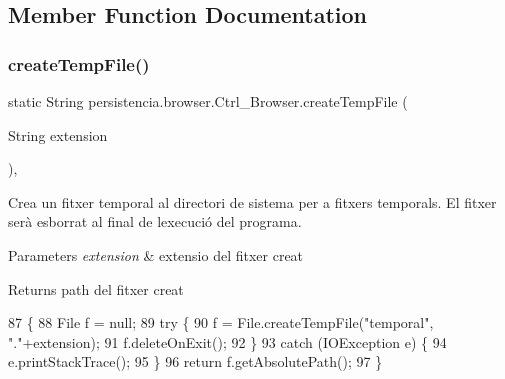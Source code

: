 \subsection{Member Function Documentation}
\mbox{\label{classpersistencia_1_1browser_1_1Ctrl__Browser_ad64712e539747815fb590a7adfaf5517}} 
\subsubsection{\texorpdfstring{create\+Temp\+File()}{createTempFile()}}
{\footnotesize\ttfamily static String persistencia.\+browser.\+Ctrl\+\_\+\+Browser.\+create\+Temp\+File (\begin{DoxyParamCaption}\item[{String}]{extension }\end{DoxyParamCaption})\hspace{0.3cm}{\ttfamily [inline]}, {\ttfamily [static]}}



Crea un fitxer temporal al directori de sistema per a fitxers temporals. El fitxer serà esborrat al final de l\textquotesingle{}execució del programa. 


\begin{DoxyParams}{Parameters}
{\em extension} & extensio del fitxer creat \\
\hline
\end{DoxyParams}
\begin{DoxyReturn}{Returns}
path del fitxer creat 
\end{DoxyReturn}

\begin{DoxyCode}
87                                                           \{
88         File f = null;
89         \textcolor{keywordflow}{try} \{
90             f = File.createTempFile(\textcolor{stringliteral}{"temporal"}, \textcolor{stringliteral}{"."}+extension);
91             f.deleteOnExit();
92         \}
93         \textcolor{keywordflow}{catch} (IOException e) \{
94             e.printStackTrace();
95         \}
96         \textcolor{keywordflow}{return} f.getAbsolutePath();
97     \}
\end{DoxyCode}
\mbox{\label{classpersistencia_1_1browser_1_1Ctrl__Browser_ac79782a4f7fd5207498fe37e952f9b8b}} 
